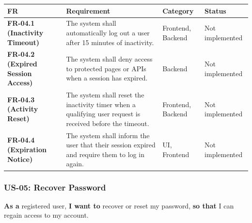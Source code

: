 \documentclass[12pt]{article}
\renewcommand{\baselinestretch}{1.5}
\begin{document}
\begingroup
\small
\renewcommand{\baselinestretch}{1.0}\selectfont
\renewcommand{\arraystretch}{1.15}
\setlength{\tabcolsep}{6pt}
\begin{longtable}{|>{\raggedright\arraybackslash}p{}|>{\raggedright\arraybackslash}p{}|>{\raggedright\arraybackslash}p{}|>{\raggedright\arraybackslash}p{}|}
\hline
\textbf{FR} & \textbf{Requirement} & \textbf{Category} & \textbf{Status} \\ \hline
\endhead
\textbf{FR-04.1 (Inactivity Timeout)} & The system shall automatically log out a user after 15 minutes of inactivity. & Frontend, Backend & Not implemented \\ \hline
\textbf{FR-04.2 (Expired Session Access)} & The system shall deny access to protected pages or APIs when a session has expired. & Backend & Not implemented \\ \hline
\textbf{FR-04.3 (Activity Reset)} & The system shall reset the inactivity timer when a qualifying user request is received before the timeout. & Frontend, Backend & Not implemented \\ \hline
\textbf{FR-04.4 (Expiration Notice)} & The system shall inform the user that their session expired and require them to log in again. & UI, Frontend & Not implemented \\ \hline
\end{longtable}
\endgroup
\par\medskip

\hypertarget{sec:us-05-recover-password}{}
\subsubsection*{US-05: Recover Password}
\par\medskip

\textbf{As a} registered user, \textbf{I want to} recover or reset my password, \textbf{so that} I can regain access to my account.
\par\medskip
\end{document}
